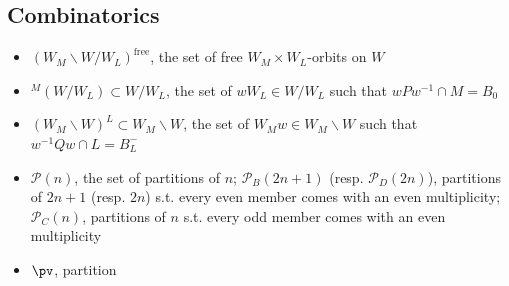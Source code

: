 \documentclass[12pt]{amsart}
\begin{document}

 \subsection{Combinatorics}
 \begin{itemize}
     \item $(W_M\backslash W / W_L)^{\mathrm{free}}$, the set of free $W_M \times W_L$-orbits on $W$
    \item ${}^M(W/W_L) \subset W/W_L$, the set of $wW_L \in W/W_L$ such that $wPw^{-1} \cap M = B_0$
    \item $(W_M\backslash W)^L \subset W_M \backslash W$, the set of $W_Mw \in W_M \backslash W$ such that $w^{-1}Qw \cap L = B_L^-$
    \item $\mathcal{P}(n)$, the set of partitions of $n$; $\mathcal{P}_{B}(2n+1)$ (resp. $\mathcal{P}_{D}(2n)$), partitions of $2n+1$ (resp. $2n$) s.t. every even member comes with an even multiplicity; $\mathcal{P}_{C}(n)$, partitions of $n$ s.t. every odd member comes with an even multiplicity 
    \item ${\pv}$, partition
 \end{itemize}
\end{document}
